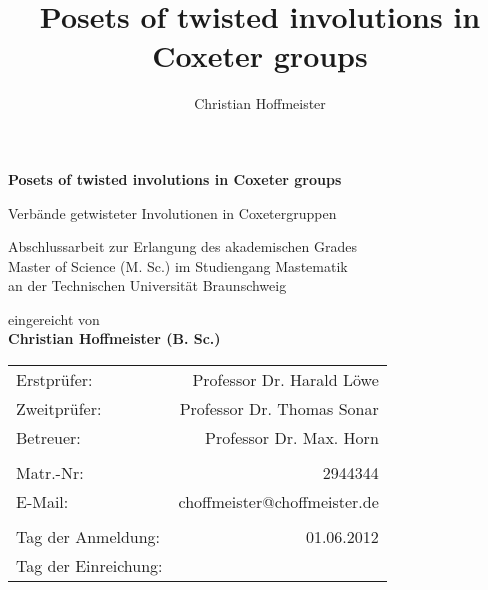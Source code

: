 \title{Posets of twisted involutions in Coxeter groups}
\author{Christian Hoffmeister}

\begin{titlepage}
\begin{center}
{\Large \bf Posets of twisted involutions in Coxeter groups}

{\large Verbände getwisteter Involutionen in Coxetergruppen}

\vspace*{4cm}
Abschlussarbeit zur Erlangung des akademischen Grades\\Master of Science (M. Sc.) im Studiengang Mastematik\\an der Technischen Universität Braunschweig

\vspace*{4cm}
eingereicht von \\
{\Large \bf Christian Hoffmeister (B. Sc.)}

\vspace*{4cm}
\begin{tabular}{lr}
	Erstprüfer: & Professor Dr. Harald Löwe \\
	Zweitprüfer: & Professor Dr. Thomas Sonar \\
	Betreuer: & Professor Dr. Max. Horn \\
	\vspace*{0.5em} & \\
	Matr.-Nr: & 2944344 \\
	E-Mail: & choffmeister@choffmeister.de \\
	\vspace*{0.5em} & \\
	Tag der Anmeldung: & 01.06.2012 \\
	Tag der Einreichung: & \\
\end{tabular}
\end{center}
\end{titlepage}